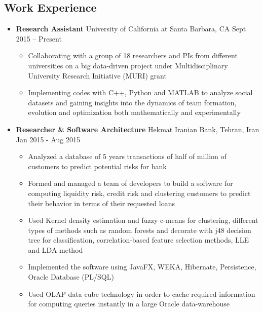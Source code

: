 \documentclass[letter]{res}
\begin{document}
\begin{resume}
		\section{Work Experience}
		\begin{itemize}[leftmargin=-.1in]
			\item \textbf{Research Assistant} \newline
			University of California at Santa Barbara, CA \hfill Sept 2015 – Present\\
			\vspace{-4mm}
			\iflong
			\begin{itemize}
				\item Collaborating with a group of 18 researchers and PIs from different universities on a big data-driven project under Multidisciplinary University Research Initiative (MURI) grant
				\item Implementing codes with C++, Python and MATLAB to analyze social datasets and gaining insights into the dynamics of team formation, evolution and optimization both mathematically and experimentally
			\end{itemize}
			\fi
			
			\item \textbf{Researcher \& Software Architecture} \newline
			Hekmat Iranian Bank, Tehran, Iran \hfill Jan 2015 - Aug 2015\\
			\vspace{-4mm}
			\iflong
			\begin{itemize}
				\item Analyzed a database of 5 years transactions of half of million of customers to predict potential risks for bank
				\item Formed and managed a team of developers to build a software for computing liquidity risk, credit risk and clustering customers to predict their behavior in terms of their requested loans 
				\item Used Kernel density estimation and fuzzy c-means for clustering, different types of methods such as random forests and decorate with j48 decision tree for classification, correlation-based feature selection methods, LLE and LDA method
				\item Implemented the software using JavaFX, WEKA, Hibernate, Persistence, Oracle Database (PL/SQL)
				\item Used OLAP data cube technology in order to cache required information for computing queries instantly in a large Oracle data-warehouse
			\end{itemize}
			\fi
			

\end{itemize}
\end{resume}
\end{document}
